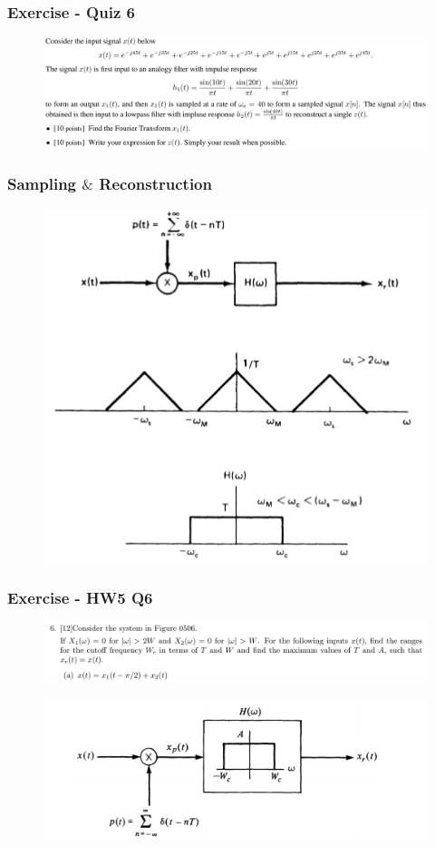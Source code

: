 \documentclass{beamer}
\begin{document}
\begin{frame}[t]
    \frametitle{Exercise - Quiz 6}
    \begin{figure}
        \includegraphics[width=1\linewidth]{quiz6.PNG}
    \end{figure}
\end{frame}

\begin{frame}
\frametitle{Sampling $\&$ Reconstruction}
\begin{figure}
\includegraphics[width=0.6\linewidth]{sample4}
\end{figure}
\end{frame}

\begin{frame}[t]
    \frametitle{Exercise - HW5 Q6}
    \begin{figure}
        \includegraphics[width=1\linewidth]{q6a}
    \end{figure}
    \begin{figure}
        \includegraphics[width=0.6\linewidth]{q6b}
    \end{figure}
\end{frame}
\end{document}
